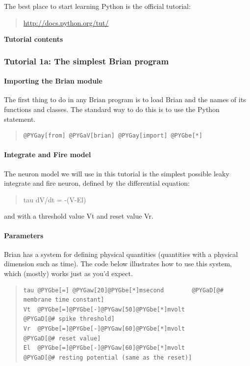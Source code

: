 \documentclass[letterpaper,10pt,english]{manual}
\begin{document}
The best place to start learning Python is the official tutorial:
\begin{quote}

\href{http://docs.python.org/tut/}{http://docs.python.org/tut/}
\end{quote}

\textbf{Tutorial contents}

\resetcurrentobjects


\subsubsection{Tutorial 1a: The simplest Brian program}


\paragraph{Importing the Brian module}

The first thing to do in any Brian program is to load Brian and the names of
its functions and classes. The standard way to do this is to use the Python
 statement.
\begin{quote}

\begin{Verbatim}[commandchars=@\[\]]
@PYGay[from] @PYGaV[brian] @PYGay[import] @PYGbe[*]
\end{Verbatim}
\end{quote}


\paragraph{Integrate and Fire model}

The neuron model we will use in this tutorial is the simplest possible
leaky integrate and fire neuron, defined by the differential equation:
\begin{quote}

tau dV/dt = -(V-El)
\end{quote}

and with a threshold value Vt and reset value Vr.


\paragraph{Parameters}

Brian has a system for defining physical quantities (quantities with
a physical dimension such as time). The code below illustrates how
to use this system, which (mostly) works just as you'd expect.
\begin{quote}

\begin{Verbatim}[commandchars=@\[\]]
tau @PYGbe[=] @PYGaw[20]@PYGbe[*]msecond        @PYGaD[@# membrane time constant]
Vt  @PYGbe[=]@PYGbe[-]@PYGaw[50]@PYGbe[*]mvolt          @PYGaD[@# spike threshold]
Vr  @PYGbe[=]@PYGbe[-]@PYGaw[60]@PYGbe[*]mvolt          @PYGaD[@# reset value]
El  @PYGbe[=]@PYGbe[-]@PYGaw[60]@PYGbe[*]mvolt          @PYGaD[@# resting potential (same as the reset)]
\end{Verbatim}
\end{quote}
\end{document}
